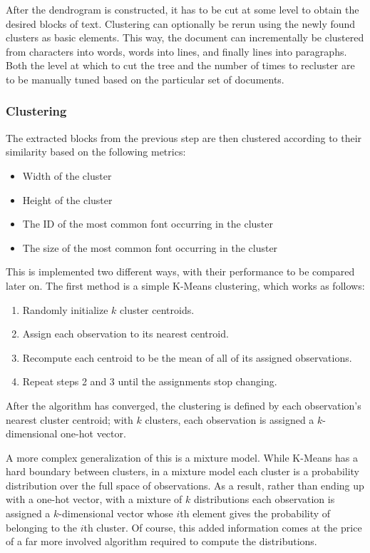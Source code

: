 After the dendrogram is constructed, it has to be cut at some level to obtain
the desired blocks of text. Clustering can optionally be rerun using the newly
found clusters as basic elements. This way, the document can incrementally be
clustered from characters into words, words into lines, and finally lines into
paragraphs. Both the level at which to cut the tree and the number of times to
recluster are to be manually tuned based on the particular set of documents.

\subsubsection{Clustering}
The extracted blocks from the previous step are then clustered according to
their similarity based on the following metrics:
\begin{itemize}
  \item Width of the cluster
  \item Height of the cluster
  \item The ID of the most common font occurring in the cluster
  \item The size of the most common font occurring in the cluster
\end{itemize}
This is implemented two different ways, with their performance to be compared
later on. The first method is a simple K-Means clustering, which works
as follows:
\begin{enumerate}
  \item Randomly initialize $k$ cluster centroids.
  \item Assign each observation to its nearest centroid.
  \item Recompute each centroid to be the mean of all of its assigned
    observations.
  \item Repeat steps 2 and 3 until the assignments stop changing.
\end{enumerate}
After the algorithm has converged, the clustering is defined by each
observation's nearest cluster centroid; with $k$ clusters, each observation is
assigned a $k$-dimensional one-hot vector.

A more complex generalization of this is a mixture model. While K-Means has a
hard boundary between clusters, in a mixture model each cluster is a probability
distribution over the full space of observations. As a result, rather than
ending up with a one-hot vector, with a mixture of $k$ distributions each
observation is assigned a $k$-dimensional vector whose $i$th element gives the
probability of belonging to the $i$th cluster. Of course, this added information
comes at the price of a far more involved algorithm required to compute the
distributions.

